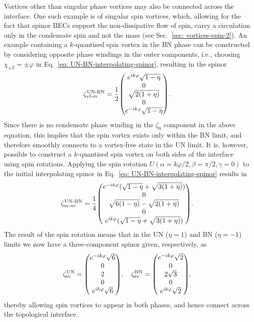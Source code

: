 Vortices other than singular phase vortices may also be connected across the
interface.
One such example is of singular spin vortices, which, allowing for the fact that
spinor BECs support the non-dissipative flow of spin, carry a circulation only
in the condensate spin and not the mass (see Sec.~\ref{sec: vortices-spin-2}).
An example containing a \(k\)-quantised spin vortex in the BN phase can be
constructed by considering opposite phase windings in the outer components,
i.e., choosing \(\chi_{\pm 2} = \pm \varphi \) in
Eq.~\eqref{eq: UN-BN-interpolating-spinor}, resulting in the spinor
\begin{align}\label{eq: UN-BN-vf-sv}
    \zeta_\text{vf-sv}^\text{UN-BN} = \frac{1}{2}\mqty(
        e^{ik\varphi}\sqrt{1 - \eta} \\
        0 \\
        \sqrt{2(1+\eta)} \\
        0 \\
        e^{-ik\varphi}\sqrt{1 - \eta}
    ).
\end{align}
Since there is no condensate phase winding in the \(\zeta_0\) component in the
above equation, this implies that the spin vortex exists only within the BN
limit, and therefore smoothly connects to a vortex-free state in the UN limit.
It is, however, possible to construct a \(k\)-quantised spin vortex on both
sides of the interface using spin rotations.
Applying the spin rotation \(U(\alpha=k\varphi/2, \beta=\pi/2,\gamma=0)\) to the
initial interpolating spinor in Eq.~\eqref{eq: UN-BN-interpolating-spinor}
results in
\begin{align}\label{eq: UN-BN-sv-sv}
    \zeta_\text{sv-sv}^\text{UN-BN} = \frac{1}{4}\mqty(
        e^{-ik\varphi}(\sqrt{1 - \eta} + \sqrt{3(1+\eta)}) \\
        0 \\
        \sqrt{6(1-\eta)} - \sqrt{2(1+\eta)} \\
        0 \\
        e^{ik\varphi}(\sqrt{1 - \eta} + \sqrt{3(1+\eta)})
    ).
\end{align}
The result of the spin rotation means that in the UN (\(\eta = 1\)) and
BN (\(\eta = -1\)) limits we now have a three-component spinor given,
respectively, as
\begin{align}
    \zeta^\text{UN}_\text{sv} = \mqty(
        e^{-ik\varphi}\sqrt{6} \\ 0 \\ 2 \\ 0 \\ e^{ik\varphi}\sqrt{6}
        ),
    \quad
    \zeta^\text{BN}_\text{sv} = \mqty(
        e^{-ik\varphi}\sqrt{2} \\ 0 \\ 2\sqrt{3} \\ 0 \\ e^{ik\varphi}\sqrt{2}
    ),
\end{align}
thereby allowing spin vortices to appear in both phases, and hence connect
across the topological interface.

